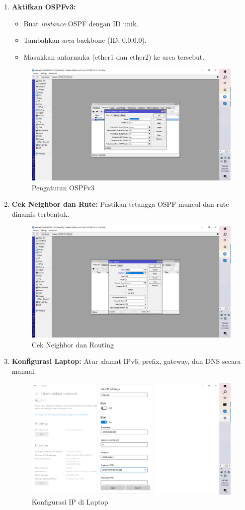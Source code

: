 \begin{enumerate}
    \item \textbf{Aktifkan OSPFv3:}
    \begin{itemize}
        \item Buat \textit{instance} OSPF dengan ID unik.
        \item Tambahkan \textit{area} backbone (ID: 0.0.0.0).
        \item Masukkan antarmuka (ether1 dan ether2) ke area tersebut.
    \end{itemize}
    \begin{figure}[H]
        \centering
        \includegraphics[width=0.5\linewidth]{P2/img/gambar5.png}
        \caption{Pengaturan OSPFv3}
        \label{fig:gambar4}
    \end{figure}

    \item \textbf{Cek Neighbor dan Rute:} Pastikan tetangga OSPF muncul dan rute dinamis terbentuk.
    \begin{figure}[H]
        \centering
        \includegraphics[width=0.5\linewidth]{P2/img/gambar6.png}
        \caption{Cek Neighbor dan Routing}
        \label{fig:gambar5}
    \end{figure}

    \item \textbf{Konfigurasi Laptop:} Atur alamat IPv6, prefix, gateway, dan DNS secara manual.
    \begin{figure}[H]
        \centering
        \includegraphics[width=0.5\linewidth]{P2/img/gambar4.png}
        \caption{Konfigurasi IP di Laptop}
        \label{fig:gambar6}
    \end{figure}


\end{enumerate}
